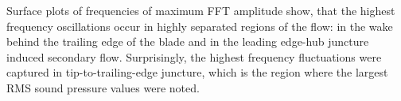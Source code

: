 Surface plots of frequencies of maximum FFT amplitude show, that the highest frequency oscillations occur in highly separated regions of the flow: in the wake behind the trailing edge of the blade and in the leading edge-hub juncture induced secondary flow. Surprisingly, the highest frequency fluctuations were captured in tip-to-trailing-edge juncture, which is the region where the largest RMS sound pressure values were noted.

